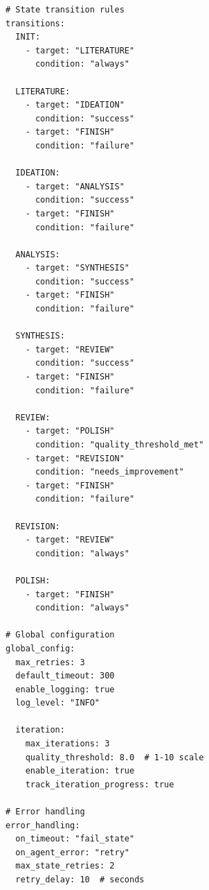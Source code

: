 \begin{verbatim}
# State transition rules
transitions:
  INIT:
    - target: "LITERATURE"
      condition: "always"
      
  LITERATURE:
    - target: "IDEATION"
      condition: "success"
    - target: "FINISH"
      condition: "failure"
      
  IDEATION:
    - target: "ANALYSIS"
      condition: "success"
    - target: "FINISH"
      condition: "failure"
      
  ANALYSIS:
    - target: "SYNTHESIS"
      condition: "success"
    - target: "FINISH"
      condition: "failure"
      
  SYNTHESIS:
    - target: "REVIEW"
      condition: "success"
    - target: "FINISH"
      condition: "failure"
      
  REVIEW:
    - target: "POLISH"
      condition: "quality_threshold_met"
    - target: "REVISION"
      condition: "needs_improvement"
    - target: "FINISH"
      condition: "failure"
      
  REVISION:
    - target: "REVIEW"
      condition: "always"
      
  POLISH:
    - target: "FINISH"
      condition: "always"

# Global configuration
global_config:
  max_retries: 3
  default_timeout: 300
  enable_logging: true
  log_level: "INFO"
  
  iteration:
    max_iterations: 3
    quality_threshold: 8.0  # 1-10 scale
    enable_iteration: true
    track_iteration_progress: true

# Error handling
error_handling:
  on_timeout: "fail_state"
  on_agent_error: "retry"
  max_state_retries: 2
  retry_delay: 10  # seconds
\end{verbatim}


